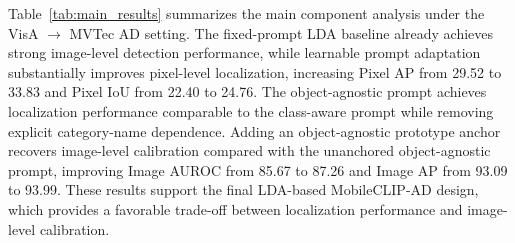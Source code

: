 \documentclass[10pt]{article}
\begin{document}
\begin{table}[H]
\centering
\caption{Main component analysis under the VisA $\rightarrow$ MVTec AD setting using MobileCLIP2-S3.
Metrics are reported in percentage as mean $\pm$ standard deviation over three seeds.}
\label{tab:main_results}
\end{table}

Table~\ref{tab:main_results} summarizes the main component analysis under the VisA $\rightarrow$ MVTec AD setting. The fixed-prompt LDA baseline already achieves strong image-level detection performance, while learnable prompt adaptation substantially improves pixel-level localization, increasing Pixel AP from 29.52 to 33.83 and Pixel IoU from 22.40 to 24.76. The object-agnostic prompt achieves localization performance comparable to the class-aware prompt while removing explicit category-name dependence. Adding an object-agnostic prototype anchor recovers image-level calibration compared with the unanchored object-agnostic prompt, improving Image AUROC from 85.67 to 87.26 and Image AP from 93.09 to 93.99. These results support the final LDA-based MobileCLIP-AD design, which provides a favorable trade-off between localization performance and image-level calibration.
\end{document}
